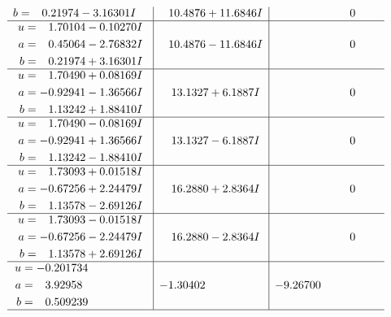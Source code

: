 \documentclass[1p]{elsarticle_modified}
\theoremstyle{definition}
\begin{document}
$$\begin{array}{c|c|c}
\begin{aligned}
b &= \phantom{-}0.21974 - 3.16301 I\end{aligned}
 & \phantom{-}10.4876 + 11.6846 I & \phantom{-0.000000 } 0 \\ \hline\begin{aligned}
u &= \phantom{-}1.70104 - 0.10270 I \\
a &= \phantom{-}0.45064 - 2.76832 I \\
b &= \phantom{-}0.21974 + 3.16301 I\end{aligned}
 & \phantom{-}10.4876 - 11.6846 I & \phantom{-0.000000 } 0 \\ \hline\begin{aligned}
u &= \phantom{-}1.70490 + 0.08169 I \\
a &= -0.92941 - 1.36566 I \\
b &= \phantom{-}1.13242 + 1.88410 I\end{aligned}
 & \phantom{-}13.1327 + 6.1887 I & \phantom{-0.000000 } 0 \\ \hline\begin{aligned}
u &= \phantom{-}1.70490 - 0.08169 I \\
a &= -0.92941 + 1.36566 I \\
b &= \phantom{-}1.13242 - 1.88410 I\end{aligned}
 & \phantom{-}13.1327 - 6.1887 I & \phantom{-0.000000 } 0 \\ \hline\begin{aligned}
u &= \phantom{-}1.73093 + 0.01518 I \\
a &= -0.67256 + 2.24479 I \\
b &= \phantom{-}1.13578 - 2.69126 I\end{aligned}
 & \phantom{-}16.2880 + 2.8364 I & \phantom{-0.000000 } 0 \\ \hline\begin{aligned}
u &= \phantom{-}1.73093 - 0.01518 I \\
a &= -0.67256 - 2.24479 I \\
b &= \phantom{-}1.13578 + 2.69126 I\end{aligned}
 & \phantom{-}16.2880 - 2.8364 I & \phantom{-0.000000 } 0 \\ \hline\begin{aligned}
u &= -0.201734\phantom{ +0.000000I} \\
a &= \phantom{-}3.92958\phantom{ +0.000000I} \\
b &= \phantom{-}0.509239\phantom{ +0.000000I}\end{aligned}
 & -1.30402\phantom{ +0.000000I} & -9.26700\phantom{ +0.000000I}\\
 \hline 
 \end{array}$$\newpage\newpage\renewcommand{\arraystretch}{1}
\end{document}
